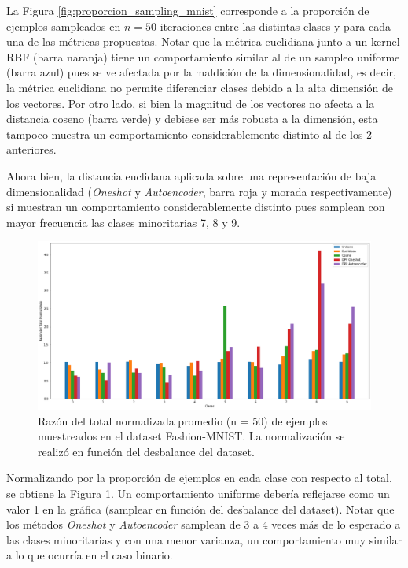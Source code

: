 La Figura \ref{fig:proporcion_sampling_mnist} corresponde a la proporción de ejemplos sampleados en $n=50$ iteraciones entre las distintas clases y para cada una de las métricas propuestas. Notar que la métrica euclidiana junto a un kernel RBF (barra naranja) tiene un comportamiento similar al de un sampleo uniforme (barra azul) pues se ve afectada por la maldición de la dimensionalidad, es decir, la métrica euclidiana no permite diferenciar clases debido a la alta dimensión de los vectores. Por otro lado, si bien la magnitud de los vectores no afecta a la distancia coseno (barra verde) y debiese ser más robusta a la dimensión, esta tampoco muestra un comportamiento considerablemente distinto al de los 2 anteriores. 

\vspace{0.2cm}

Ahora bien, la distancia euclidana aplicada sobre una representación de baja dimensionalidad (\textit{Oneshot} y \textit{Autoencoder}, barra roja y morada respectivamente) si muestran un comportamiento considerablemente distinto pues samplean con mayor frecuencia las clases minoritarias 7, 8 y 9.

\begin{figure}[ht]
    \centering
    \includegraphics[width=12cm]{img/tesis/resultados/sampling_n_10_normalizado.png}
    \caption{Razón del total normalizada promedio (n = 50) de ejemplos muestreados en el dataset Fashion-MNIST. La normalización se realizó en función del desbalance del dataset.}
    \label{fig:normalizado_sampling_mnist}
\end{figure}

\vspace{0.2cm}

Normalizando por la proporción de ejemplos en cada clase con respecto al total, se obtiene la Figura \ref{fig:normalizado_sampling_mnist}. Un comportamiento uniforme debería reflejarse como un valor 1 en la gráfica (samplear en función del desbalance del dataset). Notar que los métodos \textit{Oneshot} y \textit{Autoencoder} samplean de 3 a 4 veces más de lo esperado a las clases minoritarias y con una menor varianza, un comportamiento muy similar a lo que ocurría en el caso binario. 

